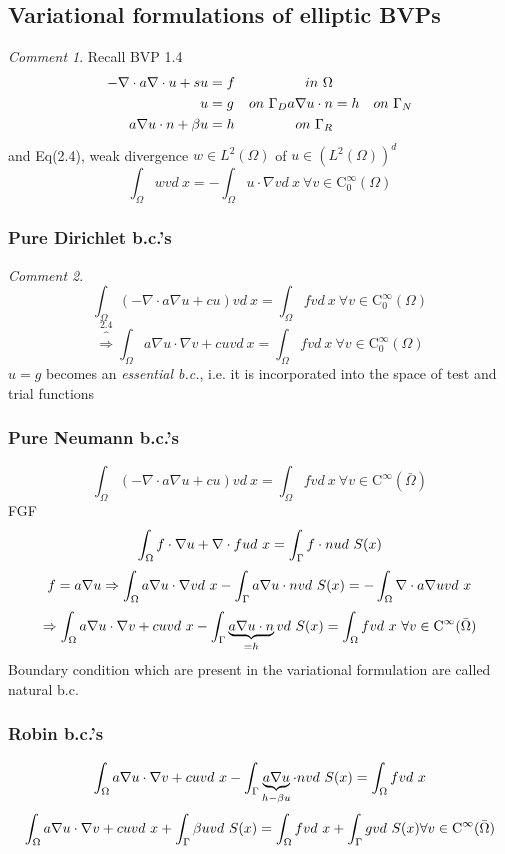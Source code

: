 \documentclass[english]{article}
\theoremstyle{definition}
\theoremstyle{remark}
\newtheorem*{comm}{Comment}
\newcommand{\bb}{\beta}					%
\newcommand{\OO}{\Omega}
\newcommand{\cinf}{\tx{C}^\infty}
\newcommand{\drw}{\Rightarrow}			%
\newcommand{\tri}{\nabla}
\newcommand{\tx}[1]{\text{#1}}
\begin{document}
\subsection{Variational formulations of elliptic BVPs}
\begin{comm}
  Recall BVP 1.4
  \begin{align}
    -\tri \cdot a \tri \cdot u + su &= f& in\ \OO\\
    u&=g &on\ \GG_D
    a \tri u \cdot n &= h& on\ \GG_N\\
    a\tri u \cdot n + \bb u &= h& on\ \GG_R
  \end{align}
  and Eq(2.4), weak divergence $w \in L^2(\OO)$ of $u \in (L^2(\OO))^d$
  $$\int_\OO w v d\ x = - \int_\OO u \cdot \tri v d\ x \ \forall v \in \cinf_0(\OO)$$
\end{comm}
\subsubsection{Pure Dirichlet b.c.'s}
\begin{comm}
  $$\int_\OO (-\tri \cdot a \tri u + cu)v d\ x = \int_\OO fv d\ x \ \forall v\in\cinf_0(\OO)$$
  $$\overbrace{\drw}^{2.4} \int_\OO a \tri u \cdot \tri v + cuv d\ x = \int_\OO fv d\ x \ \forall v\in\cinf_0(\OO)$$
  $u=g$ becomes an \emph{essential b.c.}, i.e. it is incorporated into the space of test and trial functions
\end{comm}
\subsubsection{Pure Neumann b.c.'s}
$$\int_\OO (-\tri \cdot a \tri u + c u) v d\ x = \int_\OO f v d\ x \ \forall v \in \cinf(\bar\OO)$$
FGF
$$\int_\OO f \cdot \tri u + \tri \cdot f u d\ x = \int_\GG f\cdot n u d\ S(x)$$
$$f= a \tri u \drw \int_\OO a\tri u \cdot \tri v d\ x - \int_\GG a \tri u \cdot n v d\ S(x)=-\int_\OO \tri \cdot a \tri u v d\ x$$
$$\drw \int_\OO a \tri u \cdot \tri v + c u v d\ x - \int_\GG \underbrace{a\tri u \cdot n}_{=h} v d\ S(x) = \int_\OO f v d\ x \ \forall v\in\cinf(\bar\OO)$$
Boundary condition which are present in the variational formulation are called  natural b.c.
\subsubsection{Robin b.c.'s}
$$\int_{\OO}a \tri u \cdot \tri v + c u v d\ x - \int_\GG \underbrace{a \tri u}_{h-\bb u} \cdot n v d\ S(x) = \int_\OO f v d\ x$$
$$\int_\OO a \tri u \cdot \tri v + c u v d\ x + \int_\GG \bb u v d\ S(x) = \int_\OO f v d\ x + \int_\GG g v d\ S(x) \forall v \in \cinf (\bar\OO)$$
\end{document}
